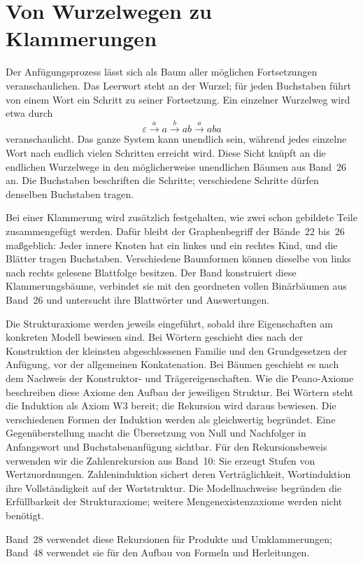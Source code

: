 \documentclass[main.tex]{subfiles}
\begin{document}
\section{Von Wurzelwegen zu Klammerungen}

Der Anfügungsprozess lässt sich als Baum aller möglichen Fortsetzungen
veranschaulichen. Das Leerwort steht an der Wurzel; für jeden Buchstaben
führt von einem Wort ein Schritt zu seiner Fortsetzung. Ein einzelner
Wurzelweg wird etwa durch
\[
 \varepsilon\xrightarrow{a}a\xrightarrow{b}ab\xrightarrow{a}aba
\]
veranschaulicht. Das ganze System kann unendlich sein, während jedes
einzelne Wort nach endlich vielen Schritten erreicht wird. Diese Sicht
knüpft an die endlichen Wurzelwege in den möglicherweise unendlichen
Bäumen aus Band~26 an. Die Buchstaben beschriften die Schritte;
verschiedene Schritte dürfen denselben Buchstaben tragen.

Bei einer Klammerung wird zusätzlich festgehalten, wie zwei schon
gebildete Teile zusammengefügt werden. Dafür bleibt der Graphenbegriff
der Bände~22 bis~26 maßgeblich: Jeder innere Knoten hat ein linkes und
ein rechtes Kind, und die Blätter tragen Buchstaben. Verschiedene
Baumformen können dieselbe von links nach rechts gelesene Blattfolge
besitzen. Der Band konstruiert diese Klammerungsbäume, verbindet sie
mit den geordneten vollen Binärbäumen aus Band~26 und untersucht ihre
Blattwörter und Auswertungen.

Die Strukturaxiome werden jeweils eingeführt, sobald ihre Eigenschaften
am konkreten Modell bewiesen sind. Bei Wörtern geschieht dies nach der
Konstruktion der kleinsten abgeschlossenen Familie und den Grundgesetzen
der Anfügung, vor der allgemeinen Konkatenation. Bei Bäumen geschieht
es nach dem Nachweis der Konstruktor- und Trägereigenschaften. Wie die
Peano-Axiome beschreiben diese Axiome den Aufbau der jeweiligen Struktur.
Bei Wörtern steht die Induktion als Axiom W3 bereit; die Rekursion wird
daraus bewiesen. Die verschiedenen Formen der Induktion werden als
gleichwertig begründet. Eine Gegenüberstellung macht die Übersetzung
von Null und Nachfolger in Anfangswort und Buchstabenanfügung sichtbar.
Für den Rekursionsbeweis verwenden wir die Zahlenrekursion aus Band~10:
Sie erzeugt Stufen von Wertzuordnungen. Zahleninduktion sichert deren
Verträglichkeit, Wortinduktion ihre Vollständigkeit auf der Wortstruktur.
Die Modellnachweise begründen die Erfüllbarkeit der Strukturaxiome;
weitere Mengenexistenzaxiome werden nicht benötigt.

Band~28 verwendet diese Rekursionen für Produkte und Umklammerungen;
Band~48 verwendet sie für den Aufbau von Formeln und Herleitungen.
\end{document}
